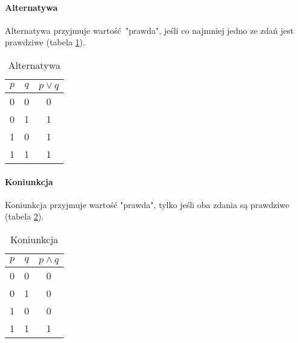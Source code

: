         \paragraph{Alternatywa}
        Alternatywa przyjmuje wartość "prawda", jeśli co najmniej jedno ze zdań jest prawdziwe (tabela \ref{tab:alternatywa}).
        \begin{table}[htbp!]
            \centering
            \caption{Alternatywa}
            \label{tab:alternatywa}
            \vspace{3mm}
            \begin{tabular}{ccc}
                \textbf{$p$} & \textbf{$q$} & \textbf{$p \vee q$} \\
                \midrule
                0 & 0 & 0\\
                0 & 1 & 1\\
                1 & 0 & 1\\
                1 & 1 & 1\\
                \bottomrule
            \end{tabular}
        \end{table}

        \paragraph{Koniunkcja}
        Koniunkcja przyjmuje wartość "prawda", tylko jeśli oba zdania są prawdziwe (tabela \ref{tab:koniunkcja}).
        \begin{table}[htbp!]
            \centering
            \caption{Koniunkcja}
            \label{tab:koniunkcja}
            \vspace{3mm}
            \begin{tabular}{ccc}
                \textbf{$p$} & \textbf{$q$} & \textbf{$p \wedge q$} \\
                \midrule
                0 & 0 & 0\\
                0 & 1 & 0\\
                1 & 0 & 0\\
                1 & 1 & 1\\
                \bottomrule
            \end{tabular}
        \end{table}

